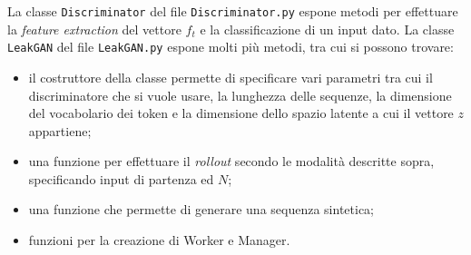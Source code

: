 
La classe \lstinline{Discriminator} del file \lstinline{Discriminator.py} espone metodi per effettuare la \emph{feature extraction} del vettore $f_t$ e la classificazione di un input dato.
La classe \lstinline{LeakGAN} del file \lstinline{LeakGAN.py} espone molti più metodi, tra cui si possono trovare:
\begin{itemize}
  \item il costruttore della classe permette di specificare vari parametri tra cui il discriminatore che si vuole usare, la lunghezza delle sequenze, la dimensione del vocabolario dei token e la dimensione dello spazio latente a cui il vettore $z$ appartiene;
  \item una funzione per effettuare il \emph{rollout} secondo le modalità descritte sopra, specificando input di partenza ed $N$;
  \item una funzione che permette di generare una sequenza sintetica;
  \item funzioni per la creazione di Worker e Manager.
\end{itemize}

